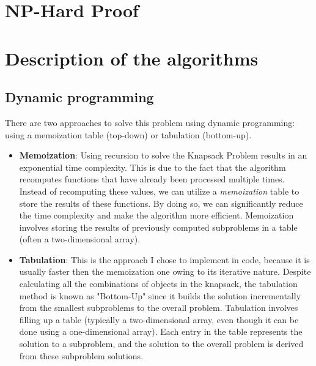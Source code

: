 \documentclass[runningheads]{llncs}
\begin{document}
\section{NP-Hard Proof}

\section{Description of the algorithms}
\subsection{Dynamic programming}
There are two approaches to solve this problem using dynamic programming:
using a memoization table (top-down) or tabulation (bottom-up). 
\begin{itemize}
    \item \textbf{Memoization}: Using recursion to solve the Knapsack Problem results in an exponential time complexity. This is due to the fact that the algorithm recomputes functions that have already been processed multiple times. Instead of recomputing these values, we can utilize a \textit{memoization} table to store the results of these functions. By doing so, we can significantly reduce the time complexity and make the algorithm more efficient. Memoization involves storing the results of previously computed subproblems in a table (often a two-dimensional array).
    \item \textbf{Tabulation}: This is the approach I chose to implement in code, because it is usually faster then the memoization one owing to its iterative nature. Despite calculating all the combinations of objects in the knapsack, the tabulation method is known as "Bottom-Up" since it builds the solution incrementally from the smallest subproblems to the overall problem. Tabulation involves filling up a table (typically a two-dimensional array, even though it can be done using a one-dimensional array). Each entry in the table represents the solution to a subproblem, and the solution to the overall problem is derived from these subproblem solutions.
\end{itemize}
\end{document}
